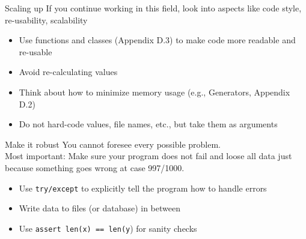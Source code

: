 \documentclass{beamer}
\begin{document}
\begin{frame}{Scaling up}
	If you continue working in this field, look into aspects like code style, re-usability, scalability
	\begin{itemize}
		\item Use functions and classes (Appendix D.3) to make code more readable and re-usable
		\item Avoid re-calculating values
		\item Think about how to minimize memory usage (e.g., Generators, Appendix D.2)
		\item Do not hard-code values, file names, etc., but take them as arguments
	\end{itemize}	
\end{frame}




\begin{frame}{Make it robust}
You cannot foresee every possible problem.\\
Most important: Make sure your program does not fail and loose all data just because something goes wrong at case 997/1000.
	\begin{itemize}
		\item Use \texttt{try/except} to explicitly tell the program how to handle errors
		\item Write data to files (or database) in between
		\item Use \texttt{assert len(x) == len(y}) for sanity checks
	\end{itemize}	
\end{frame}


%
%






\end{document}
